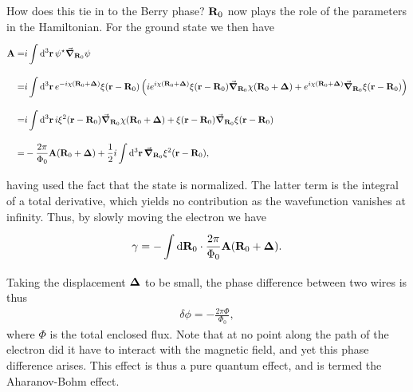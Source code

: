 How does this tie in to the Berry phase? $\vb{R}_{0}$ now plays the role of the parameters in the Hamiltonian. For the ground state we then have
\begin{align*}
	\vb{A} =& i\int\limits_{}^{}\dd[3]{\vb{r}}\psi^{\star}\grad_{\vb{R}_{0}}\psi \\
	       =& i\int\limits_{}^{}\dd[3]{\vb{r}}e^{-i\chi(\vb{R}_{0} + \vb*{\Delta})}\xi(\vb{r} - \vb{R}_{0})\left(ie^{i\chi(\vb{R}_{0} + \vb*{\Delta})}\xi(\vb{r} - \vb{R}_{0})\grad_{\vb{R}_{0}}\chi(\vb{R}_{0} + \vb*{\Delta}) + e^{i\chi(\vb{R}_{0} + \vb*{\Delta})}\grad_{\vb{R}_{0}}\xi(\vb{r} - \vb{R}_{0})\right) \\
	       =& i\int\limits_{}^{}\dd[3]{\vb{r}}i\xi^{2}(\vb{r} - \vb{R}_{0})\grad_{\vb{R}_{0}}\chi(\vb{R}_{0} + \vb*{\Delta}) + \xi(\vb{r} - \vb{R}_{0})\grad_{\vb{R}_{0}}\xi(\vb{r} - \vb{R}_{0}) \\
	       =& -\frac{2\pi}{\Phi_{0}}\vb{A}(\vb{R}_{0} + \vb*{\Delta}) + \frac{1}{2}i\int\limits_{}^{}\dd[3]{\vb{r}}\grad_{\vb{R}_{0}}\xi^{2}(\vb{r} - \vb{R}_{0}),
\end{align*}
having used the fact that the state is normalized. The latter term is the integral of a total derivative, which yields no contribution as the wavefunction vanishes at infinity. Thus, by slowly moving the electron we have
\begin{align*}
	\gamma = -\int\limits_{}^{}\dd{\vb{R}_{0}}\cdot\frac{2\pi}{\Phi_{0}}\vb{A}(\vb{R}_{0} + \vb*{\Delta}).
\end{align*}
Taking the displacement $\vb*{\Delta}$ to be small, the phase difference between two wires is thus
\begin{align*}
	\delta\phi = -\frac{2\pi\Phi}{\Phi_{0}},
\end{align*}
where $\Phi$ is the total enclosed flux. Note that at no point along the path of the electron did it have to interact with the magnetic field, and yet this phase difference arises. This effect is thus a pure quantum effect, and is termed the Aharanov-Bohm effect.

